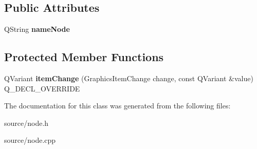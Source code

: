 \subsection*{Public Attributes}
\begin{DoxyCompactItemize}
\item 
\hypertarget{classNode_a686e4202143435a3e785c8bc0ff5f55a}{}Q\+String {\bfseries name\+Node}\label{classNode_a686e4202143435a3e785c8bc0ff5f55a}

\end{DoxyCompactItemize}
\subsection*{Protected Member Functions}
\begin{DoxyCompactItemize}
\item 
\hypertarget{classNode_a5030285fe1ef2188dbe6b3d7a5a1b6c2}{}Q\+Variant {\bfseries item\+Change} (Graphics\+Item\+Change change, const Q\+Variant \&value) Q\+\_\+\+D\+E\+C\+L\+\_\+\+O\+V\+E\+R\+R\+I\+D\+E\label{classNode_a5030285fe1ef2188dbe6b3d7a5a1b6c2}

\end{DoxyCompactItemize}


The documentation for this class was generated from the following files\+:\begin{DoxyCompactItemize}
\item 
source/node.\+h\item 
source/node.\+cpp\end{DoxyCompactItemize}
